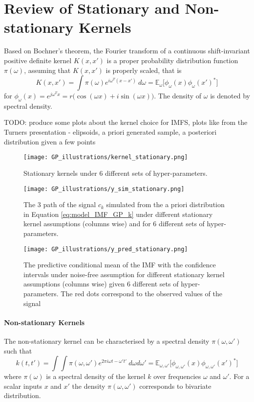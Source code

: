 \section{Review of Stationary and Non-stationary Kernels}
Based on Bochner's theorem, the Fourier transform of a continuous shift-invariant positive definite kernel $K(x,x')$ is a proper probability distribution function $\pi(\omega)$, assuming that $K(x,x')$ is properly scaled, that is
\begin{equation}
K(x,x') = \int \pi(\omega) e^{ i \omega^T (x - x') }\ d\omega = \mathbb{E}_{\omega}\big[ \phi_\omega (x) \phi_\omega (x')^* \big] 
\end{equation}
for $\phi_\omega (x)  =e^{j \omega^T x} = r \big( \cos (\omega x ) + i \sin (\omega x )\big)$. The density of $\omega$ is denoted by spectral density. 


TODO: produce some plots about the kernel choice for IMFS, plots like from the Turners presentation - elipsoids, a priori generated sample, a posteriori distribution given a few points


\begin{figure}[H]
\centering
\texttt{[image: GP\_illustrations/kernel\_stationary.png]}
\caption{Stationary kernels under 6 different sets of hyper-parameters.}\label{fig:}
\end{figure}

\begin{figure}[H]
\centering
\texttt{[image: GP\_illustrations/y\_sim\_stationary.png]}
\caption{The 3 path of the signal $c_k$ simulated from the a priori distribution in Equation \eqref{eq:model_IMF_GP_k} under different stationary kernel assumptions (columns wise) and for 6 different sets of hyper-parameters.}\label{fig:}
\end{figure}

\begin{figure}[H]
\centering
\texttt{[image: GP\_illustrations/y\_pred\_stationary.png]}
\caption{The predictive conditional mean of the IMF with the confidence intervals  under  noise-free assumption for different stationary kernel assumptions (columns wise) given 6 different sets of hyper-parameters. The red dots correspond to the observed values of the signal}\label{fig:}
\end{figure}



\paragraph{Non-stationary Kernels}
The non-stationary kernel can be characterised by a spectral density $\pi(\omega,\omega')$ such that
\begin{equation}
k(t,t') =\int \int \pi(\omega,\omega') e^{ 2 \pi i \omega t - \omega' t' }\ d\omega d\omega' = \mathbb{E}_{\omega,\omega'}\big[ \phi_{\omega,\omega'} (x) \phi_{\omega,\omega'} (x')^* \big] 
\end{equation}
where $\pi(\omega)$ is a spectral density of the kernel $k$ over frequencies $\omega$ and $\omega'$. For a scalar inputs $x$ and $x'$ the density $\pi(\omega,\omega')$ corresponds to bivariate distribution. 

